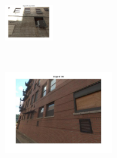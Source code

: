 \begin{minipage}{0.75\linewidth}
\begin{minipage}{\linewidth}
                \colorbox{myRed}{\includegraphics[trim = 35mm 30mm 35mm 30mm, clip=true, height=16mm]{imgs/Pval/exImproved04/improved04.jpg}}
            \end{minipage} 
        \end{minipage}
        \vspace{3mm}
        \\
        \begin{minipage}{0.34\linewidth}
            \centering
            \vspace{0mm}
            \includegraphics[trim = 45mm 40mm 45mm 30mm, clip=true, height=36mm]{imgs/Pval/exMix09/query.jpg}
        \end{minipage}
